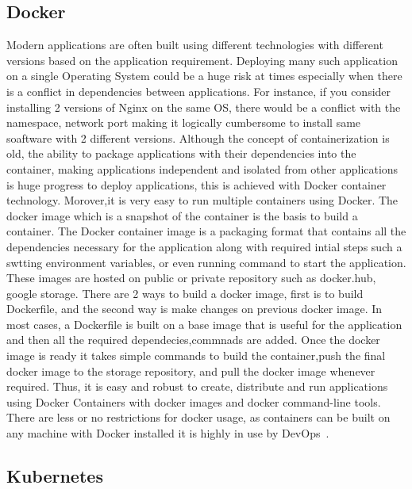 \subsection{Docker}

Modern applications are often built using different technologies with
different versions based on the application requirement. Deploying
many such application on a single Operating System could be a huge
risk at times especially when there is a conflict in dependencies
between applications. For instance, if you consider installing 2
versions of Nginx on the same OS, there would be a conflict with the
namespace, network port making it logically cumbersome to install same
soaftware with 2 different versions. Although the concept of
containerization is old, the ability to package applications with
their dependencies into the container, making applications independent
and isolated from other applications is huge progress to deploy
applications, this is achieved with Docker container
technology. Morover,it is very easy to run multiple containers using
Docker. The docker image which is a snapshot of the container is the
basis to build a container. The Docker container image is a packaging
format that contains all the dependencies necessary for the
application along with required intial steps such a swtting
environment variables, or even running command to start the
application. These images are hosted on public or private repository
such as docker.hub, google storage.  There are 2 ways to build a
docker image, first is to build Dockerfile, and the second way is make
changes on previous docker image. In most cases, a Dockerfile is built
on a base image that is useful for the application and then all the
required dependecies,commnads are added. Once the docker image is
ready it takes simple commands to build the container,push the final
docker image to the storage repository, and pull the docker image
whenever required. Thus, it is easy and robust to create, distribute
and run applications using Docker Containers with docker images and
docker command-line tools. There are less or no restrictions for
docker usage, as containers can be built on any machine with Docker
installed it is highly in use by DevOps~\cite{hid-sp18-602-docker}.

\subsection{Kubernetes}

